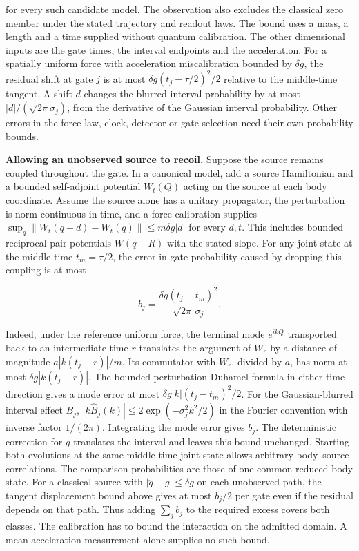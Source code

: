 \documentclass[11pt,a4paper]{article}
\begin{document}
for every such candidate model. The observation also excludes the
classical zero member under the stated trajectory and readout laws. The
bound uses a mass, a length and a time supplied without quantum
calibration. The other dimensional inputs are the gate times, the
interval endpoints and the acceleration. For a spatially uniform force
with acceleration miscalibration bounded by \(\delta g\), the residual
shift at gate \(j\) is at most \(\delta g(t_j-\tau/2)^2/2\) relative to
the middle-time tangent. A shift \(d\) changes the blurred interval
probability by at most \(|d|/(\sqrt{2\pi}\sigma_j)\), from the
derivative of the Gaussian interval probability. Other errors in the
force law, clock, detector or gate selection need their own probability
bounds.

\textbf{Allowing an unobserved source to recoil.} Suppose the source
remains coupled throughout the gate. In a canonical model, add a source
Hamiltonian and a bounded self-adjoint potential \(W_t(Q)\) acting on
the source at each body coordinate. Assume the source alone has a
unitary propagator, the perturbation is norm-continuous in time, and a
force calibration supplies \(\sup_q\|W_t(q+d)-W_t(q)\|\le m\delta g|d|\)
for every \(d,t\). This includes bounded reciprocal pair potentials
\(W(q-R)\) with the stated slope. For any joint state at the middle time
\(t_m=\tau/2\), the error in gate probability caused by dropping this
coupling is at most

\[b_j=\frac{\delta g(t_j-t_m)^2}{\sqrt{2\pi}\,\sigma_j}.\]

Indeed, under the reference uniform force, the terminal mode \(e^{ikQ}\)
transported back to an intermediate time \(r\) translates the argument
of \(W_r\) by a distance of magnitude \(a|k(t_j-r)|/m\). Its commutator
with \(W_r\), divided by \(a\), has norm at most \(\delta g|k(t_j-r)|\).
The bounded-perturbation Duhamel formula in either time direction gives
a mode error at most \(\delta g|k|(t_j-t_m)^2/2\). For the
Gaussian-blurred interval effect \(B_j\),
\(|k\widehat B_j(k)|\le2\exp(-\sigma_j^2 k^2/2)\) in the Fourier
convention with inverse factor \(1/(2\pi)\). Integrating the mode error
gives \(b_j\). The deterministic correction for \(g\) translates the
interval and leaves this bound unchanged. Starting both evolutions at
the same middle-time joint state allows arbitrary body--source
correlations. The comparison probabilities are those of one common
reduced body state. For a classical source with
\(|\ddot q-g|\le\delta g\) on each unobserved path, the tangent
displacement bound above gives at most \(b_j/2\) per gate even if the
residual depends on that path. Thus adding \(\sum_j b_j\) to the
required excess covers both classes. The calibration has to bound the
interaction on the admitted domain. A mean acceleration measurement
alone supplies no such bound.
\end{document}

